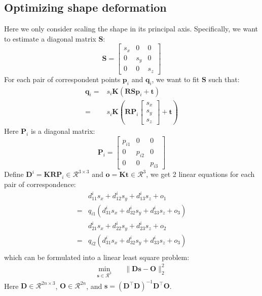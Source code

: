 \documentclass[10pt,twocolumn,letterpaper]{article}
\begin{document}
\subsection{Optimizing shape deformation}

\noindent
Here we only consider scaling the shape in its principal axis. Specifically, we want to estimate a diagonal matrix $\mathbf{S}$:
\begin{equation}
\mathbf{S}=\left [
\begin{array}{ccc}
s_x & 0 & 0 \\
0 & s_y & 0 \\
0 & 0 & s_z
\end{array}
\right ]
\end{equation}
For each pair of correspondent points $\mathbf{p}_i$ and $\mathbf{q}_i$, we want to fit $\mathbf{S}$ such that:
\begin{equation}
\begin{split}
\mathbf{q}_i=&s_i\mathbf{K}(\mathbf{R}\mathbf{S}\mathbf{p}_i + \mathbf{t})\\
=&s_i\mathbf{K}(\mathbf{R}\mathbf{P}_i\left [
\begin{array}{c}
s_x \\
s_y \\
s_z
\end{array}
\right ] + \mathbf{t})
\end{split}
\end{equation}
Here $\mathbf{P}_i$ is a diagonal matrix:
\begin{equation}
\mathbf{P}_i=\left [
\begin{array}{ccc}
p_{i1} & 0 & 0\\
0 & p_{i2} & 0\\
0 & 0 & p_{i3}
\end{array}
\right ]
\end{equation}
Define $\mathbf{D}^i = \mathbf{KRP}_i\in\mathcal{R}^{3\times 3}$ and $\mathbf{o}=\mathbf{Kt}\in\mathcal{R}^{3}$, we get 2 linear equations for each pair of correspondence:
\begin{equation}
\begin{split}
&d^i_{11}s_x+d^i_{12}s_y+d^i_{13}s_z+o_1\\
=&q_{i1}(d^i_{31}s_x+d^i_{32}s_y+d^i_{33}s_z+o_3)\\
&d^i_{21}s_x+d^i_{22}s_y+d^i_{23}s_z+o_2\\
=&q_{i2}(d^i_{31}s_x+d^i_{32}s_y+d^i_{33}s_z+o_3)\\
\end{split}
\end{equation}
which can be formulated into a linear least square problem:
\begin{equation}
\begin{split}
\min_{\mathbf{s}\in\mathcal{R}^3}&\quad \|\mathbf{D}\mathbf{s}-\mathbf{O}\|_2^2
\end{split}
\end{equation}
Here $\mathbf{D}\in\mathcal{R}^{2n\times 3}$, $\mathbf{O}\in\mathcal{R}^{2n}$, and $\mathbf{s}=(\mathbf{D}^\top\mathbf{D})^{-1}\mathbf{D}^\top\mathbf{O}$.
\end{document}
